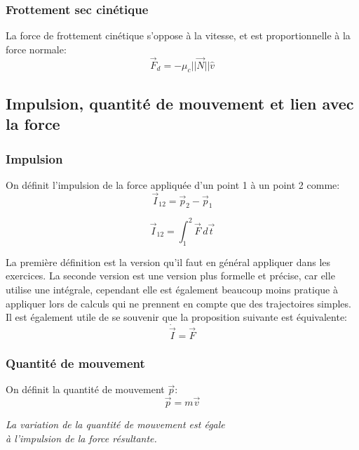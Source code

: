 \documentclass{article}
\numberwithin{equation}{section}
\begin{document}
\subsubsection{Frottement sec cinétique}
La force de frottement cinétique s'oppose à la vitesse, et est proportionnelle à la force normale:
\begin{equation}
	\boxed{ \vec F_d = - \mu_c ||\vec N|| \hat v }
\end{equation}

\subsection{Impulsion, quantité de mouvement et lien avec la force}

\subsubsection{Impulsion}
On définit l'impulsion de la force appliquée d'un point 1 à un point 2 comme:
\begin{equation}
	\boxed{ \vec I_{12} = \vec p_2 - \vec p_1 }
\end{equation}

\begin{equation}
	\boxed{ \vec I_{12} = \int_1^2 \vec F \, d \vec t }
\end{equation}

La première définition est la version qu'il faut en général appliquer dans les exercices. La seconde version est une version plus formelle et précise, car elle utilise une intégrale, cependant elle est également beaucoup moins pratique à appliquer lors de calculs qui ne prennent en compte que des trajectoires simples. \\

Il est également utile de se souvenir que la proposition suivante est équivalente:
\begin{equation}
	\boxed{ \dot{\vec{I}} = \vec F }
\end{equation}

\subsubsection{Quantité de mouvement}
On définit la quantité de mouvement \(\vec p\):
\begin{equation} \label{eq:defquantitemouvement}
	\boxed{ \vec p = m \vec v }
\end{equation}

\begin{center}
	\emph{La variation de la quantité de mouvement est égale \\ à l'impulsion de la force résultante.}
\end{center}
\end{document}
